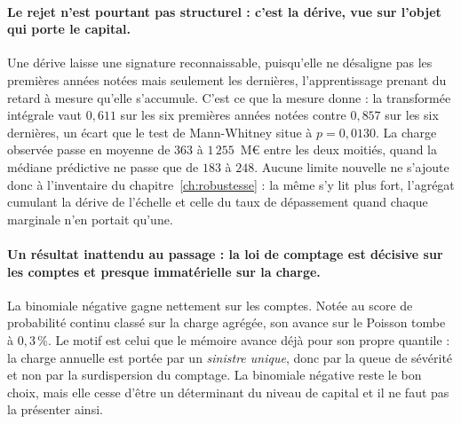 \paragraph{Le rejet n'est pourtant pas structurel : c'est la dérive, vue sur l'objet qui porte le
capital.} Une dérive laisse une signature reconnaissable, puisqu'elle ne désaligne pas les
premières années notées mais seulement les dernières, l'apprentissage prenant du retard à mesure
qu'elle s'accumule. C'est ce que la mesure donne : la transformée intégrale vaut $0{,}611$ sur les
six premières années notées contre $0{,}857$ sur les six dernières, un écart que le test de
Mann-Whitney situe à $p = 0{,}0130$. La charge observée passe en moyenne de $363$ à
$1\,255$~M\euro{} entre les deux moitiés, quand la médiane prédictive ne passe que de $183$ à
$248$. Aucune limite nouvelle ne s'ajoute donc à l'inventaire du
chapitre~\ref{ch:robustesse} : la même s'y lit plus fort, l'agrégat cumulant la dérive de
l'échelle et celle du taux de dépassement quand chaque marginale n'en portait qu'une.

\paragraph{Un résultat inattendu au passage : la loi de comptage est décisive sur les comptes et
presque immatérielle sur la charge.} La binomiale négative gagne nettement sur les comptes. Notée
au score de probabilité continu classé sur la charge agrégée, son avance sur le Poisson tombe à
$0{,}3\,\%$. Le motif est celui que le mémoire avance déjà pour son propre quantile : la charge
annuelle est portée par un \emph{sinistre unique}, donc par la queue de sévérité et non par la
surdispersion du comptage. La binomiale négative reste le bon choix, mais elle cesse d'être un
déterminant du niveau de capital et il ne faut pas la présenter ainsi.

